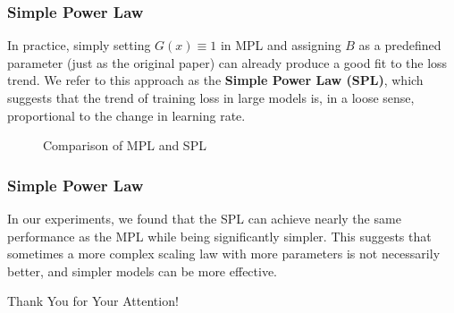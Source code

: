 \documentclass[aspectratio=169]{beamer}
\begin{document}
\begin{frame}
    \frametitle{Simple Power Law}
    In practice, simply setting $G(x) \equiv 1$ in MPL and assigning
    $B$ as a predefined parameter (just as the original paper) can
    already produce a good fit to the loss trend. We refer to this
    approach as the \textbf{Simple Power Law (SPL)}, which suggests
    that the trend of training loss in large models is, in a loose
    sense, proportional to the change in learning rate.

    \begin{figure}
        \centering
        \caption{Comparison of MPL and SPL}\label{fig:spl}
    \end{figure}
\end{frame}

\begin{frame}
    \frametitle{Simple Power Law}

    In our experiments, we found that the SPL can achieve nearly the
    same performance as the MPL while being significantly simpler.
    This suggests that sometimes a more complex scaling law with more
    parameters is not necessarily better, and simpler models can be
    more effective.
\end{frame}

\begin{frame}
    \begin{center}
        \Huge Thank You for Your Attention!
    \end{center}
\end{frame}
\end{document}
